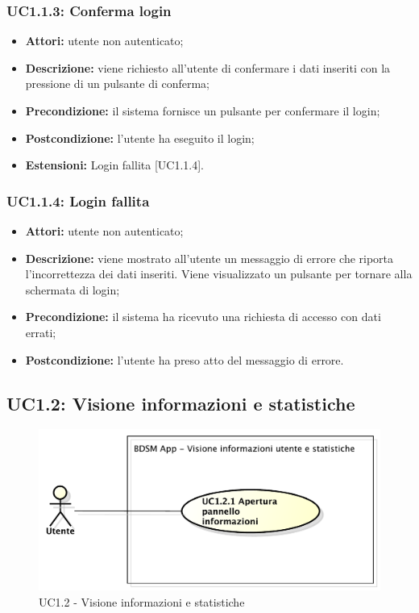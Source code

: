\subsubsection{UC1.1.3: Conferma login}

\begin{itemize}
    \item \textbf{Attori:} utente non autenticato;
    \item \textbf{Descrizione:} viene richiesto all'utente di confermare i dati inseriti con la pressione di un pulsante di conferma;
    \item \textbf{Precondizione:} il sistema fornisce un pulsante per confermare il login;
    \item \textbf{Postcondizione:} l'utente ha eseguito il login;
    \item \textbf{Estensioni:} Login fallita [UC1.1.4].
\end{itemize}

\subsubsection{UC1.1.4: Login fallita}

\begin{itemize}
    \item \textbf{Attori:} utente non autenticato;
    \item \textbf{Descrizione:} viene mostrato all'utente un messaggio di errore che riporta l'incorrettezza dei dati inseriti. Viene visualizzato un pulsante per tornare alla schermata di login;
    \item \textbf{Precondizione:} il sistema ha ricevuto una richiesta di accesso con dati errati;
    \item \textbf{Postcondizione:} l'utente ha preso atto del messaggio di errore.
\end{itemize}

\pagebreak

\subsection{UC1.2: Visione informazioni e statistiche}

\begin{figure}[htbp]
    \centering
    \centerline{\includegraphics[scale=0.6]{./images/UC1_2.pdf}}
    \caption{UC1.2 - Visione informazioni e statistiche}
\end{figure}

